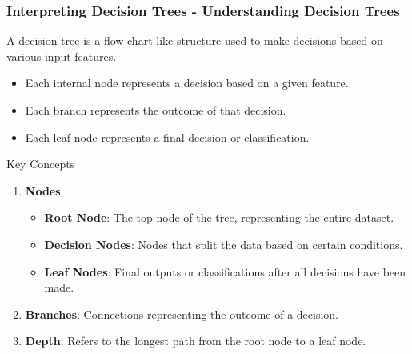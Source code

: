 \documentclass[aspectratio=169]{beamer}
\begin{document}
\begin{frame}[fragile]
    \frametitle{Interpreting Decision Trees - Understanding Decision Trees}
    
    A decision tree is a flow-chart-like structure used to make decisions based on various input features. 

    \begin{itemize}
        \item Each internal node represents a decision based on a given feature.
        \item Each branch represents the outcome of that decision.
        \item Each leaf node represents a final decision or classification.
    \end{itemize}

    \begin{block}{Key Concepts}
        \begin{enumerate}
            \item \textbf{Nodes}:
                \begin{itemize}
                    \item \textbf{Root Node}: The top node of the tree, representing the entire dataset.
                    \item \textbf{Decision Nodes}: Nodes that split the data based on certain conditions.
                    \item \textbf{Leaf Nodes}: Final outputs or classifications after all decisions have been made.
                \end{itemize}
            \item \textbf{Branches}: Connections representing the outcome of a decision.
            \item \textbf{Depth}: Refers to the longest path from the root node to a leaf node.
        \end{enumerate}
    \end{block}
\end{frame}
\end{document}
